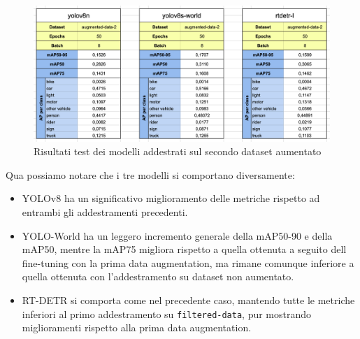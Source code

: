 \begin{figure}[ht]
    \centering
    \includegraphics[width=1\textwidth]{files/capitoli/4-sperimentazione-risultati/assets/augmented-data-2-metrics.png}
    \caption{\label{fig:augmented-data-2-metrics}Risultati test dei modelli addestrati sul secondo dataset aumentato}
\end{figure}

Qua possiamo notare che i tre modelli si comportano diversamente: 

\begin{itemize}
    \item YOLOv8 ha un significativo miglioramento delle metriche rispetto ad entrambi gli addestramenti precedenti.
    \item YOLO-World ha un leggero incremento generale della mAP50-90 e della mAP50, mentre la mAP75 migliora rispetto a quella ottenuta a seguito dell fine-tuning con la prima data augmentation, ma rimane comunque inferiore a quella ottenuta con l'addestramento su dataset non aumentato.
    \item RT-DETR si comporta come nel precedente caso, mantendo tutte le metriche inferiori al primo addestramento su \texttt{filtered-data}, pur mostrando miglioramenti rispetto alla prima data augmentation.
    
\end{itemize}

\clearpage

